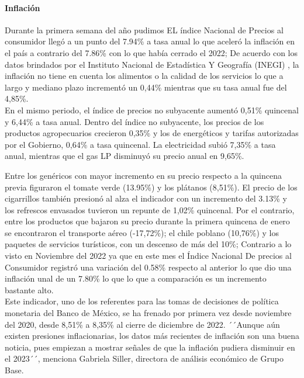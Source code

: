 \documentclass{article}
\theoremstyle{mytheoremstyle}
\theoremstyle{mytheoremstyle}
\theoremstyle{myproblemstyle}
\begin{document}
\paragraph{Inflación}

Durante la primera semana del año pudimos EL índice Nacional de Precios al consumidor llegó a un punto del 7.94\% a tasa anual lo que aceleró la inflación en el país a contrario del 7.86\% con lo que había cerrado el 2022; De acuerdo con los datos brindados por el Instituto Nacional de Estadística Y Geografía (INEGI) , la inflación no tiene en cuenta los alimentos o la calidad de los servicios lo que a largo y mediano plazo incrementó un 0,44\% mientras que su tasa anual fue del 4,85\%.\\

En el mismo periodo, el índice de precios no subyacente aumentó 0,51\% quincenal y 6,44\% a tasa anual. Dentro del índice no subyacente, los precios de los productos agropecuarios crecieron 0,35\% y los de energéticos y tarifas autorizadas por el Gobierno, 0,64\% a tasa quincenal. La electricidad subió 7,35\% a tasa anual, mientras que el gas LP disminuyó su precio anual en 9,65\%.

Entre los genéricos con mayor incremento en su precio respecto a la quincena previa figuraron el tomate verde (13.95\%) y los plátanos (8,51\%). El precio de los cigarrillos también presionó al alza el indicador con un incremento del 3.13\% y los refrescos envasados tuvieron un repunte de 1,02\% quincenal. Por el contrario, entre los productos que bajaron su precio durante la primera quincena de enero se encontraron el transporte aéreo (-17,72\%); el chile poblano (10,76\%) y los paquetes de servicios turísticos, con un descenso de más del 10\%; Contrario a lo visto en Noviembre del 2022 ya que en este mes el Índice Nacional De precios al Consumidor registró una variación del 0.58\% respecto al anterior lo que dio una inflación unal de un 7.80\% lo que lo que a comparación es un incremento bastante alto.\\

Este indicador, uno de los referentes para las tomas de decisiones de política monetaria del Banco de México, se ha frenado por primera vez desde noviembre del 2020, desde 8,51\% a 8,35\% al cierre de diciembre de 2022. ´´Aunque aún existen presiones inflacionarias, los datos más recientes de inflación son una buena noticia, pues empiezan a mostrar señales de que la inflación pudiera disminuir en el 2023´´, menciona Gabriela Siller, directora de análisis económico de Grupo Base.\\
\end{document}

